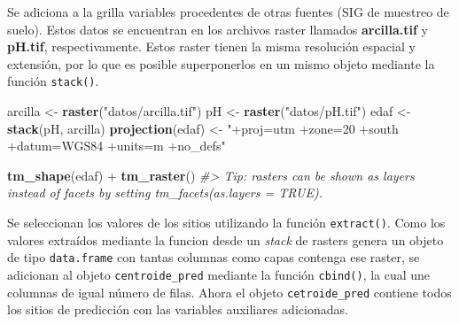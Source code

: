 \documentclass[11pt,b5paper,]{krantz}
\newenvironment{Shaded}{}{}
\newcommand{\CommentTok}[1]{\textcolor[rgb]{0.38,0.63,0.69}{\textit{#1}}}
\newcommand{\KeywordTok}[1]{\textcolor[rgb]{0.00,0.44,0.13}{\textbf{#1}}}
\newcommand{\NormalTok}[1]{#1}
\newcommand{\OperatorTok}[1]{\textcolor[rgb]{0.40,0.40,0.40}{#1}}
\newcommand{\StringTok}[1]{\textcolor[rgb]{0.25,0.44,0.63}{#1}}
\begin{document}
Se adiciona a la grilla variables procedentes de otras fuentes (SIG de muestreo de suelo). Estos datos se encuentran en los archivos raster llamados \textbf{arcilla.tif} y \textbf{pH.tif}, respectivamente. Estos raster tienen la misma resolución espacial y extensión, por lo que es posible superponerlos en un mismo objeto mediante la función \texttt{stack()}.

\begin{Shaded}
\begin{Highlighting}[]
\NormalTok{arcilla <-}\StringTok{ }\KeywordTok{raster}\NormalTok{(}\StringTok{"datos/arcilla.tif"}\NormalTok{)}
\NormalTok{pH <-}\StringTok{ }\KeywordTok{raster}\NormalTok{(}\StringTok{"datos/pH.tif"}\NormalTok{)}
\NormalTok{edaf <-}\StringTok{ }\KeywordTok{stack}\NormalTok{(pH, arcilla)}
\KeywordTok{projection}\NormalTok{(edaf) <-}
\StringTok{  "+proj=utm +zone=20 +south}
\StringTok{   +datum=WGS84 +units=m +no_defs"}

\KeywordTok{tm_shape}\NormalTok{(edaf) }\OperatorTok{+}
\StringTok{  }\KeywordTok{tm_raster}\NormalTok{()}
\CommentTok{#> Tip: rasters can be shown as layers instead of facets by setting tm_facets(as.layers = TRUE).}
\end{Highlighting}
\end{Shaded}

\hypertarget{htmlwidget-3817}{}

\hypertarget{htmlwidget-1721}{}

Se seleccionan los valores de los sitios utilizando la función \texttt{extract()}. Como los valores extraídos mediante la funcion desde un \emph{stack} de rasters genera un objeto de tipo \texttt{data.frame} con tantas columnas como capas contenga ese raster, se adicionan al objeto \texttt{centroide\_pred} mediante la función \texttt{cbind()}, la cual une columnas de igual número de filas. Ahora el objeto \texttt{cetroide\_pred} contiene todos los sitios de predicción con las variables auxiliares adicionadas.
\end{document}
